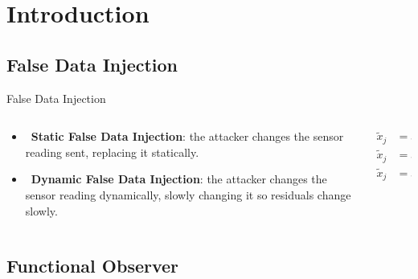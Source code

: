 
\section{Introduction}%
\label{sec:introduction}

\subsection{False Data Injection}%
\label{subsec:fdi}

\begin{slide}{False Data Injection}
  \begin{columns}[c]
    \begin{column}{0.48\textwidth}
      \begin{itemize}
        \item \cmark{}~\textbf{Static False Data Injection}: the attacker
              changes the sensor reading sent, replacing it statically.
        \item \xmark{}~\textbf{Dynamic False Data Injection}: the attacker
              changes the sensor reading dynamically, slowly changing it so
              residuals change slowly.
      \end{itemize}
    \end{column}%
    \hfill%
    \begin{column}{0.48\textwidth}
      \begin{align}
        \tilde{x}_{j} & = x_{i},            \\
        \tilde{x}_{j} & = x_{j}+\delta,     \\
        \tilde{x}_{j} & = x_{j}\cdot\alpha,
      \end{align}
    \end{column}%
  \end{columns}
\end{slide}

\subsection{Functional Observer}%
\label{subsec:functional-observer}

